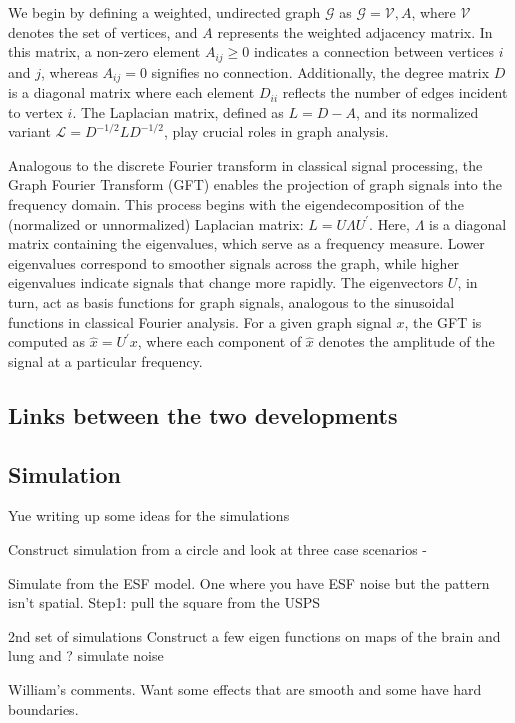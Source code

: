 \documentclass[12pt]{article}
\begin{document}
We begin by defining a weighted, undirected graph $\mathcal{G}$ as $\mathcal{G} = {\mathcal{V}, A}$, where $\mathcal{V}$ denotes the set of vertices, and $A$ represents the weighted adjacency matrix. In this matrix, a non-zero element $A_{ij} \geq 0$ indicates a connection between vertices $i$ and $j$, whereas $A_{ij} = 0$ signifies no connection. Additionally, the degree matrix $D$ is a diagonal matrix where each element $D_{ii}$ reflects the number of edges incident to vertex $i$. The Laplacian matrix, defined as $L = D - A$, and its normalized variant $\mathcal{L} = D^{-1/2}LD^{-1/2}$, play crucial roles in graph analysis.

Analogous to the discrete Fourier transform in classical signal processing, the Graph Fourier Transform (GFT) enables the projection of graph signals into the frequency domain. This process begins with the eigendecomposition of the (normalized or unnormalized) Laplacian matrix: $L = U\Lambda U^{\prime}$. Here, $\Lambda$ is a diagonal matrix containing the eigenvalues, which serve as a frequency measure. Lower eigenvalues correspond to smoother signals across the graph, while higher eigenvalues indicate signals that change more rapidly. The eigenvectors $U$, in turn, act as basis functions for graph signals, analogous to the sinusoidal functions in classical Fourier analysis. For a given graph signal $x$, the GFT is computed as $\hat{x} = U^{\prime} x$, where each component of $\hat{x}$ denotes the amplitude of the signal at a particular frequency.

\subsection{Links between the two developments}

\subsection{Simulation}
Yue writing up some ideas for the simulations

Construct simulation from a circle and look at three case scenarios - 

Simulate from the ESF model.  One where you have ESF noise but the pattern isn't spatial. 
Step1: pull the square from the USPS



2nd set of simulations
Construct a few eigen functions on maps of the brain and lung and ?  simulate noise


William's comments.  Want some effects that are smooth and some have hard boundaries.
\end{document}
